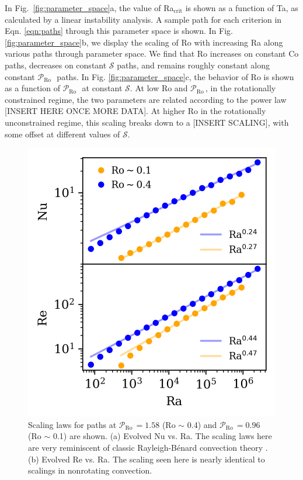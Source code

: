 \documentclass[twocolumn, amsmath, amsfonts, amssymb]{aastex62}
\newcommand{\RB}{Rayleigh-B\'{e}nard }
\newcommand{\pro}{\ensuremath{\mathcal{P}_{\text{Ro}}\,}}
\begin{document}
\label{sec:results}
In Fig.~\ref{fig:parameter_space}a, the value of Ra$_{\text{crit}}$
is shown as a function of Ta, as
calculated by a linear instability analysis. A sample path for
each criterion in Eqn. \ref{eqn:paths} through
this parameter space is shown.
In Fig. \ref{fig:parameter_space}b, we display the scaling of Ro
with increasing Ra along various paths through parameter space.
We find that Ro increases on constant Co paths, decreases on constant $\mathcal{S}$
paths, and remains roughly constant along constant \pro$\,$ paths.
In Fig. \ref{fig:parameter_space}c, the behavior of Ro is shown as
a function of \pro$\,$ at constant $\mathcal{S}$.
At low Ro and \pro, in the rotationally constrained regime, the two parameters
are related according to the power law [INSERT HERE ONCE MORE DATA].
At higher Ro in the rotationally unconstrained regime, this scaling breaks down
to a [INSERT SCALING], with some offset at different values of $\mathcal{S}$.

\begin{figure}[t!]
\includegraphics{./figs/nu_and_re.png}
\caption{Scaling laws for paths at $\pro = 1.58$ (Ro $\sim$ 0.4) and
$\pro = 0.96$ (Ro $\sim$ 0.1) are shown. 
(a) Evolved Nu vs. Ra. The scaling laws here are very reminiscent of classic \RB convection
theory \citep{ahlers&all2009}.
(b) Evolved Re vs. Ra.
The scaling seen here is nearly identical to scalings in nonrotating convection.
\label{fig:nu_and_re} }
\end{figure}
\end{document}
